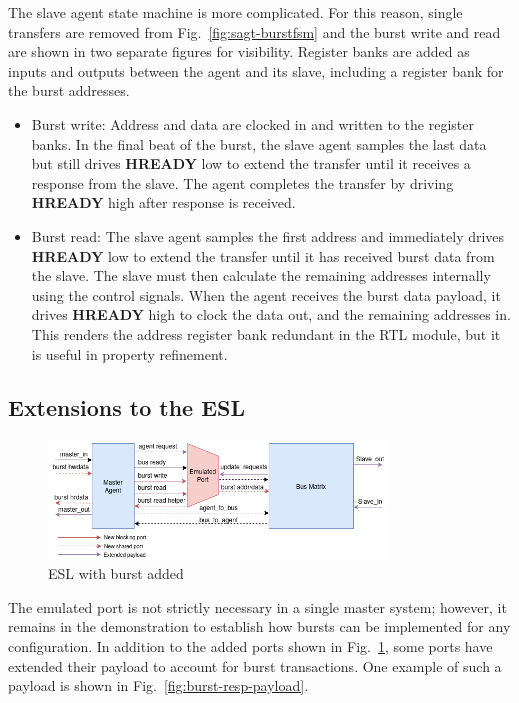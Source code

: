 The slave agent state machine is more complicated. For this reason, single transfers are removed from Fig.~\ref{fig:sagt-burstfsm} and the burst write and read are shown in two separate figures for visibility. Register banks are added as inputs and outputs between the agent and its slave, including a register bank for the burst addresses. 
\begin{itemize}
 \item Burst write: Address and data are clocked in and written to the register banks. In the final beat of the burst, the slave agent samples the last data but still drives \textbf{HREADY} low to extend the transfer until it receives a response from the slave. The agent completes the transfer by driving \textbf{HREADY} high after response is received.
 \item Burst read: The slave agent samples the first address and immediately drives \textbf{HREADY} low to extend the transfer until it has received burst data from the slave. The slave must then calculate the remaining addresses internally using the control signals. When the agent receives the burst data payload, it drives \textbf{HREADY} high to clock the data out, and the remaining addresses in. This renders the address register bank redundant in the RTL module, but it is useful in property refinement.  
\end{itemize}

\subsection{Extensions to the ESL}
\begin{figure}[hbt]
    \begin{center}
        \includegraphics[width=0.8\textwidth]{figs/ESL/burst_esl.png}
    \end{center}
    \caption{ESL with burst added}
    \label{fig:esl-burst}
\end{figure}

The emulated port is not strictly necessary in a single master system; however, it remains in the demonstration to establish how bursts can be implemented for any configuration. In addition to the added ports shown in Fig.~\ref{fig:esl-burst}, some ports have extended their payload to account for burst transactions. One example of such a payload is shown in Fig.~\ref{fig:burst-resp-payload}. \par
 
